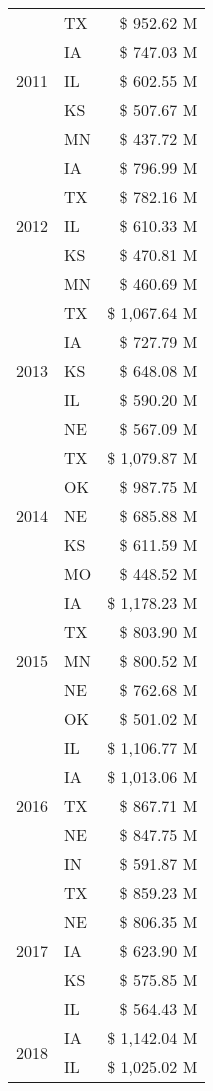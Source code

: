 \begin{tabular}{llr}
\cline{1-3}
\multirow[t]{5}{*}{2011} & TX & \$ 952.62 M \\
 & IA & \$ 747.03 M \\
 & IL & \$ 602.55 M \\
 & KS & \$ 507.67 M \\
 & MN & \$ 437.72 M \\
\cline{1-3}
\multirow[t]{5}{*}{2012} & IA & \$ 796.99 M \\
 & TX & \$ 782.16 M \\
 & IL & \$ 610.33 M \\
 & KS & \$ 470.81 M \\
 & MN & \$ 460.69 M \\
\cline{1-3}
\multirow[t]{5}{*}{2013} & TX & \$ 1,067.64 M \\
 & IA & \$ 727.79 M \\
 & KS & \$ 648.08 M \\
 & IL & \$ 590.20 M \\
 & NE & \$ 567.09 M \\
\cline{1-3}
\multirow[t]{5}{*}{2014} & TX & \$ 1,079.87 M \\
 & OK & \$ 987.75 M \\
 & NE & \$ 685.88 M \\
 & KS & \$ 611.59 M \\
 & MO & \$ 448.52 M \\
\cline{1-3}
\multirow[t]{5}{*}{2015} & IA & \$ 1,178.23 M \\
 & TX & \$ 803.90 M \\
 & MN & \$ 800.52 M \\
 & NE & \$ 762.68 M \\
 & OK & \$ 501.02 M \\
\cline{1-3}
\multirow[t]{5}{*}{2016} & IL & \$ 1,106.77 M \\
 & IA & \$ 1,013.06 M \\
 & TX & \$ 867.71 M \\
 & NE & \$ 847.75 M \\
 & IN & \$ 591.87 M \\
\cline{1-3}
\multirow[t]{5}{*}{2017} & TX & \$ 859.23 M \\
 & NE & \$ 806.35 M \\
 & IA & \$ 623.90 M \\
 & KS & \$ 575.85 M \\
 & IL & \$ 564.43 M \\
\cline{1-3}
\multirow[t]{5}{*}{2018} & IA & \$ 1,142.04 M \\
 & IL & \$ 1,025.02 M \\

\end{tabular}
